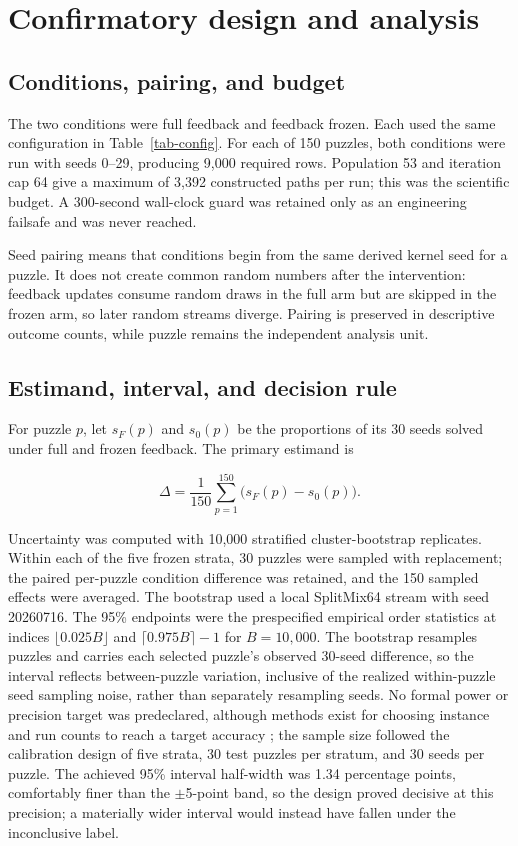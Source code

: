 \documentclass[pdflatex,sn-basic,iicol]{sn-jnl}
\begin{document}
\section{Confirmatory design and analysis}

\subsection{Conditions, pairing, and budget}

The two conditions were full feedback and feedback frozen. Each used the same configuration in Table~\ref{tab-config}. For each of 150 puzzles, both conditions were run with seeds 0--29, producing 9,000 required rows. Population 53 and iteration cap 64 give a maximum of 3,392 constructed paths per run; this was the scientific budget. A 300-second wall-clock guard was retained only as an engineering failsafe and was never reached.

Seed pairing means that conditions begin from the same derived kernel seed for a puzzle. It does not create common random numbers after the intervention: feedback updates consume random draws in the full arm but are skipped in the frozen arm, so later random streams diverge. Pairing is preserved in descriptive outcome counts, while puzzle remains the independent analysis unit.

\subsection{Estimand, interval, and decision rule}

For puzzle $p$, let $s_F(p)$ and $s_0(p)$ be the proportions of its 30 seeds solved under full and frozen feedback. The primary estimand is

\begin{equation}
\Delta=\frac{1}{150}\sum_{p=1}^{150}\bigl(s_F(p)-s_0(p)\bigr).
\end{equation}

Uncertainty was computed with 10,000 stratified cluster-bootstrap replicates. Within each of the five frozen strata, 30 puzzles were sampled with replacement; the paired per-puzzle condition difference was retained, and the 150 sampled effects were averaged. The bootstrap used a local SplitMix64 stream with seed 20260716. The 95\% endpoints were the prespecified empirical order statistics at indices $\lfloor0.025B\rfloor$ and $\lceil0.975B\rceil-1$ for $B=10,000$. The bootstrap resamples puzzles and carries each selected puzzle's observed 30-seed difference, so the interval reflects between-puzzle variation, inclusive of the realized within-puzzle seed sampling noise, rather than separately resampling seeds. No formal power or precision target was predeclared, although methods exist for choosing instance and run counts to reach a target accuracy \citep{campelo2019samplesize}; the sample size followed the calibration design of five strata, 30 test puzzles per stratum, and 30 seeds per puzzle. The achieved 95\% interval half-width was 1.34 percentage points, comfortably finer than the \(\pm\)5-point band, so the design proved decisive at this precision; a materially wider interval would instead have fallen under the inconclusive label.
\end{document}
